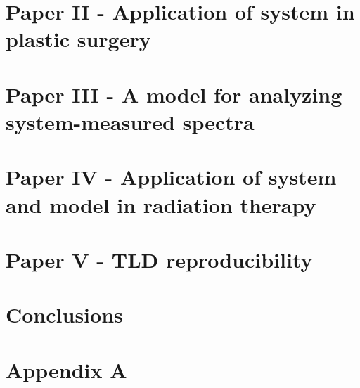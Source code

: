 \documentclass[letterpaper,12pt,twoside,openright]{report} %
\begin{document}
\chapter{Paper II - Application of system in plastic surgery}

\printbibliography[heading=subbibliography]

\chapter{Paper III - A model for analyzing system-measured spectra}

\printbibliography[heading=subbibliography]

\chapter{Paper IV - Application of system and model in radiation therapy}
%

\chapter{Paper V - TLD reproducibility}
%

\chapter{Conclusions}
%



\appendix
\chapter{Appendix A}
\end{document}
